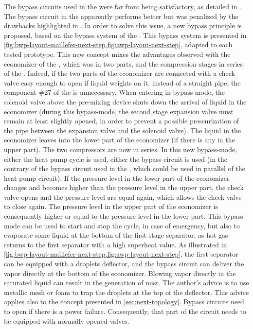 The bypass circuits used in the \AWP{} were far from being
satisfactory, as detailed in . The bypass
circuit in the \BWP{} apparently performs better but was penalized by
the drawbacks highlighted in
. In order to solve this issue, a new bypass principle is proposed, based on the bypass system
of the \BWP{}. This bypass system is presented in
\cref{fig:bwp-layout-maillefer-next-step,fig:awp-layout-next-step},
adapted to each tested prototype. This new concept mixes the
advantages observed with the economizer of the \AWP{}, which was in
two parts, and the compression stages in series of the \BWP{}. Indeed,
if the two parts of the economizer are connected with a check valve
easy enough to open if liquid weights on it, instead of a straight
pipe, the component \#27 of the \BWP{} is unnecessary. When entering
in bypass-mode, the solenoid valve above the pre-mixing
device  shuts down the
arrival of liquid in the economizer (during this bypass-mode, the
second stage expansion valve must remain at least slightly opened, in
order to prevent a possible pressurization of the pipe between the
expansion valve and the solenoid valve). The liquid in the economizer
leaves into the lower part of the economizer (if there is any in the
upper part). The two compressors are now in series. In this new
bypass-mode, either the heat pump cycle is used, either the bypass
circuit is used (in the contrary of the bypass circuit used in the
\BWP{}, which could be used in parallel of the heat pump circuit). If
the pressure level in the lower part of the economizer changes and
becomes higher than the pressure level in the upper part, the check valve opens and the pressure level are equal
again, which allows the check valve to close again. The pressure level
in the upper part of the economizer is consequently higher or equal to
the pressure level in the lower part. This bypass-mode can be used to
start and stop the cycle, in case of emergency, but also to evaporate
some liquid at the bottom of the first stage separator, as hot gas
returns to the first separator with a high superheat value. As
illustrated in
\cref{fig:bwp-layout-maillefer-next-step,fig:awp-layout-next-step},
the first separator can be equipped with a droplets
deflector, and the bypass circuit can deliver
the vapor directly at the bottom of the economizer. Blowing vapor
directly in the saturated liquid can result in the generation of
mist. The author's advice is to use metallic mesh or foam to trap the
droplets at the top of the deflector. This advice applies also to the
concept presented in \cref{sec:next-topology}. Bypass circuits need to
open if there is a power failure. Consequently, that part of the
circuit needs to be equipped with normally opened valves.

